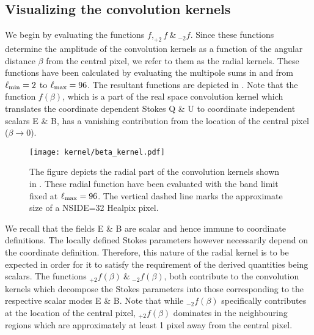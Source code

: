 
 
\subsection{Visualizing the convolution kernels} \label{sec:visualize_operator}
We begin by evaluating the functions $f, _{+2}f ~\&~ _{-2}f $. Since these functions determine the amplitude of the convolution kernels as a function of the angular distance $\beta$ from the central pixel, we refer to them as the radial kernels. These functions have been calculated by evaluating the multipole sums in  and  from $\ell_{\rm min}=2$ to $\ell_{\rm max}=96$. The resultant functions are depicted in . Note that the function $f(\beta)$, which is a part of the  real space convolution  kernel which translates the coordinate dependent Stokes Q \& U to coordinate independent scalars E \& B, has a vanishing contribution from the location of the central pixel ($\beta \rightarrow 0$). 
%
\begin{figure}[!hbt]
\centering
\texttt{[image: kernel/beta\_kernel.pdf]}
\caption{The figure depicts the radial part of the convolution kernels shown in . These radial function have been evaluated with the band limit fixed at $\ell_{\rm max}=96$. The vertical dashed line marks the approximate size of a NSIDE=32 Healpix pixel.}
\label{fig:beta_kernel}
\end{figure}
%
We recall that the fields E \& B are scalar and hence immune to coordinate definitions. The locally defined Stokes parameters however necessarily depend on the coordinate definition. Therefore, this nature of the radial kernel is to be expected in order for it to satisfy the requirement of the derived quantities being scalars. The functions $_{+2}f(\beta)~\&~_{-2}f(\beta)$, both contribute to the convolution kernels which decompose the Stokes parameters into those corresponding to the respective scalar modes E \& B. Note that while $_{-2}f(\beta)$ specifically contributes at the location of the central pixel, $_{+2}f(\beta)$ dominates in the neighbouring regions which are approximately at least 1 pixel away from the central pixel.

